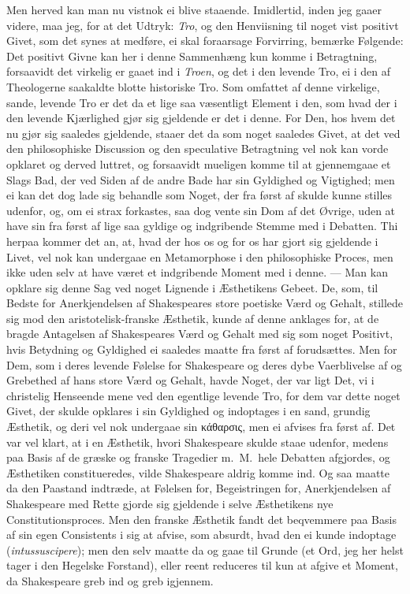 \documentclass[12pt,a4paper]{book}
\newcommand{\apage}[1]{\marginnote{\footnotesize\textit{[#1]}}}
\begin{document}
Men herved kan man nu vistnok ei blive staaende. Imidlertid, inden jeg
gaaer videre, maa jeg, for at det Udtryk: \emph{Tro}, og den Henviisning til
noget vist positivt Givet, som det synes at medføre, ei skal foraarsage
Forvirring, bemærke Følgende: Det positivt Givne kan her i denne
Sammenhæng kun komme i Betragtning, forsaavidt det virkelig er gaaet
ind i \emph{Troen}, og det i den levende Tro, ei i den af Theologerne
saakaldte blotte historiske Tro. Som omfattet af denne virkelige,
sande, levende Tro er det da et lige saa væsentligt Element i den, som
hvad der i den levende Kjærlighed gjør sig gjeldende er det i denne. For
Den, hos hvem det nu gjør sig saaledes gjeldende, staaer det da som
noget saaledes Givet, at det ved den philosophiske Discussion og den
speculative Betragtning vel nok kan vorde opklaret og derved luttret,
og forsaavidt mueligen komme til at gjennemgaae et Slags Bad, der ved
Siden af de andre Bade har sin Gyldighed og Vigtighed; men ei kan det
dog lade sig behandle som Noget, der fra først af skulde kunne stilles
udenfor, og, om ei strax forkastes, saa dog vente sin Dom af det
Øvrige, uden at have sin fra først af lige saa gyldige og indgribende
Stemme med i \apage{60} Debatten. Thi herpaa kommer det an, at, hvad der hos os og
for os har gjort sig gjeldende i Livet, vel nok kan undergaae en
Metamorphose i den philosophiske Proces, men ikke uden selv at have
været et indgribende Moment med i denne. --- Man kan opklare sig denne
Sag ved noget Lignende i Æsthetikens Gebeet. De, som, til Bedste for
Anerkjendelsen af Shakespeares store poetiske Værd og Gehalt, stillede
sig mod den aristotelisk-franske Æsthetik, kunde af denne anklages for,
at de bragde Antagelsen af Shakespeares Værd og Gehalt med sig som
noget Positivt, hvis Betydning og Gyldighed ei saaledes maatte fra
først af forudsættes. Men for Dem, som i deres levende Følelse for
Shakespeare og deres dybe Vaerblivelse af og Grebethed af hans store
Værd og Gehalt, havde Noget, der var ligt Det, vi i christelig Henseende
mene ved den egentlige levende Tro, for dem var dette noget Givet, der
skulde opklares i sin Gyldighed og indoptages i en sand, grundig
Æsthetik, og deri vel nok undergaae sin κάθαρσις, men ei afvises fra
først af. Det var vel klart, at i en Æsthetik, hvori Shakespeare skulde
staae udenfor, medens paa Basis af de græske og franske Tragedier m.\
M.\ hele Debatten afgjordes, og Æsthetiken constitueredes, vilde
Shakespeare aldrig komme ind. Og saa maatte da den Paastand indtræde,
at Følelsen for, Begeistringen for, Anerkjendelsen af Shakespeare med
Rette gjorde sig gjeldende i selve Æsthetikens nye Constitutionsproces.
Men den franske Æsthetik fandt det beqvemmere paa Basis af sin egen
Consistents i sig at afvise, som absurdt, hvad den ei kunde indoptage
(\textit{intussuscipere}); men den selv maatte da og gaae til Grunde
(et Ord, jeg her helst tager i den Hegelske Forstand), eller reent
reduceres til kun at afgive et Moment, da Shakespeare greb ind og greb
igjennem.
\end{document}
